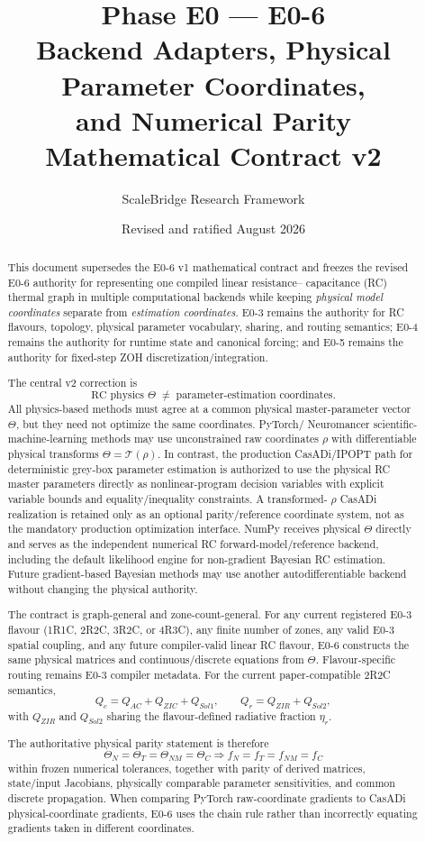 \documentclass[11pt]{article}
\title{\SB{} Phase E0 --- E0-6\\
Backend Adapters, Physical Parameter Coordinates,\\
and Numerical Parity\\
Mathematical Contract v2}
\author{ScaleBridge Research Framework}
\date{Revised and ratified August 2026}
\begin{document}
\maketitle

\begin{abstract}
This document supersedes the E0-6 v1 mathematical contract and freezes the
revised E0-6 authority for representing one compiled linear resistance--
capacitance (RC) thermal graph in multiple computational backends while keeping
\emph{physical model coordinates} separate from \emph{estimation coordinates}.
E0-3 remains the authority for RC flavours, topology, physical parameter
vocabulary, sharing, and routing semantics; E0-4 remains the authority for
runtime state and canonical forcing; and E0-5 remains the authority for
fixed-step ZOH discretization/integration.

The central v2 correction is
\[
\boxed{\text{RC physics }\Theta\;\neq\;\text{parameter-estimation coordinates}.}
\]
All physics-based methods must agree at a common physical master-parameter
vector $\Theta$, but they need not optimize the same coordinates. PyTorch/
Neuromancer scientific-machine-learning methods may use unconstrained raw
coordinates $\rho$ with differentiable physical transforms
$\Theta=\mathcal T(\rho)$. In contrast, the production CasADi/IPOPT path for
deterministic grey-box parameter estimation is authorized to use the physical
RC master parameters directly as nonlinear-program decision variables with
explicit variable bounds and equality/inequality constraints. A transformed-
$\rho$ CasADi realization is retained only as an optional parity/reference
coordinate system, not as the mandatory production optimization interface.
NumPy receives physical $\Theta$ directly and serves as the independent
numerical RC forward-model/reference backend, including the default likelihood
engine for non-gradient Bayesian RC estimation. Future gradient-based Bayesian
methods may use another autodifferentiable backend without changing the
physical authority.

The contract is graph-general and zone-count-general. For any current registered
E0-3 flavour (1R1C, 2R2C, 3R2C, or 4R3C), any finite number of zones, any valid
E0-3 spatial coupling, and any future compiler-valid linear RC flavour, E0-6
constructs the same physical matrices and continuous/discrete equations from
$\Theta$. Flavour-specific routing remains E0-3 compiler metadata. For the
current paper-compatible 2R2C semantics,
\[
Q_c=Q_{AC}+Q_{ZIC}+Q_{Sol1},\qquad
Q_r=Q_{ZIR}+Q_{Sol2},
\]
with $Q_{ZIR}$ and $Q_{Sol2}$ sharing the flavour-defined radiative fraction
$\eta_r$.

The authoritative physical parity statement is therefore
\[
\boxed{
\Theta_N=\Theta_T=\Theta_{NM}=\Theta_C
\Longrightarrow
f_N=f_T=f_{NM}=f_C
}
\]
within frozen numerical tolerances, together with parity of derived matrices,
state/input Jacobians, physically comparable parameter sensitivities, and
common discrete propagation. When comparing PyTorch raw-coordinate gradients to
CasADi physical-coordinate gradients, E0-6 uses the chain rule rather than
incorrectly equating gradients taken in different coordinates.
\end{abstract}
\end{document}
